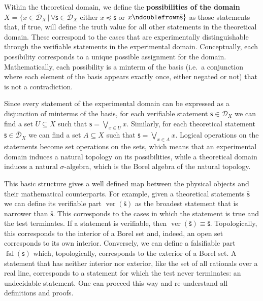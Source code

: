 \documentclass[submission,copyright,creativecommons]{eptcs}
\def\bigOR{\bigvee}
\newcommand{\stmt}[1][s] {\mathsf{#1}} %
\newcommand{\tstmt}[1][s] {\bar{\mathsf{#1}}} %
\def\ncomp{\ndoublefrown}
\def\narrower{\preccurlyeq} %
\newcommand{\edomain}[1][D] {\mathcal{#1}} %
\newcommand{\tdomain}[1][D] {\bar{\mathcal{#1}}} %
\DeclareMathOperator{\ver}{ver}
\DeclareMathOperator{\fal}{fal}
\begin{document}
Within the theoretical domain, we define the  \textbf{possibilities of the domain} $X = \{ x \in \tdomain_X \, | \, \forall \tstmt \in \tdomain_X $ either $x \narrower \tstmt$ or $x \ncomp \tstmt\}$ as those statements that, if true, will define the truth value for all other statements in the theoretical domain. These correspond to the cases that are experimentally distinguishable through the verifiable statements in the experimental domain. Conceptually, each possibility corresponds to a unique possible assignment for the domain. Mathematically, each possibility is a minterm of the basis (i.e.~a conjunction where each element of the basis appears exactly once, either negated or not) that is not a contradiction.

Since every statement of the experimental domain can be expressed as a disjunction of minterms of the basis, for each verifiable statement $\stmt \in \edomain_X$ we can find a set $U \subseteq X$ such that $\stmt = \bigOR_{x \in U} x$. Similarly, for each theoretical statement $\tstmt \in \tdomain_X$ we can find a set $A \subseteq X$ such that $\tstmt = \bigOR_{x \in A} x$. Logical operations on the statements become set operations on the sets, which means that an experimental domain induces a natural topology on its possibilities, while a theoretical domain induces a natural $\sigma$-algebra, which is the Borel algebra of the natural topology.

This basic structure gives a well defined map between the physical objects and their mathematical counterparts. For example, given a theoretical statements $\tstmt$ we can define its verifiable part $\ver(\tstmt)$ as the broadest statement that is narrower than $\tstmt$. This corresponds to the cases in which the statement is true and the test terminates. If a statement is verifiable, then $\ver(\tstmt) \equiv \tstmt$. Topologically, this corresponds to the interior of a Borel set and, indeed, an open set corresponds to its own interior. Conversely, we can define a falsifiable part $\fal(\tstmt)$ which, topologically, corresponds to the exterior of a Borel set. A statement that has neither interior nor exterior, like the set of all rationals over a real line, corresponds to a statement for which the test never terminates: an undecidable statement. One can proceed this way and re-understand all definitions and proofs.
\end{document}

